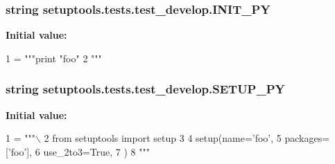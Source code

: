 \subsubsection[{I\+N\+I\+T\+\_\+\+P\+Y}]{\setlength{\rightskip}{0pt plus 5cm}string setuptools.\+tests.\+test\+\_\+develop.\+I\+N\+I\+T\+\_\+\+P\+Y}\label{namespacesetuptools_1_1tests_1_1test__develop_a4153560893d05ec7d023f67a85b90ece}
{\bfseries Initial value\+:}
\begin{DoxyCode}
1 = \textcolor{stringliteral}{"""print "foo"}
2 \textcolor{stringliteral}{"""}
\end{DoxyCode}
\hypertarget{namespacesetuptools_1_1tests_1_1test__develop_ad276e6de9b4dcd1bc0ff9daabbb0a2f5}{}
\subsubsection[{S\+E\+T\+U\+P\+\_\+\+P\+Y}]{\setlength{\rightskip}{0pt plus 5cm}string setuptools.\+tests.\+test\+\_\+develop.\+S\+E\+T\+U\+P\+\_\+\+P\+Y}\label{namespacesetuptools_1_1tests_1_1test__develop_ad276e6de9b4dcd1bc0ff9daabbb0a2f5}
{\bfseries Initial value\+:}
\begin{DoxyCode}
1 = \textcolor{stringliteral}{"""\(\backslash\)}
2 \textcolor{stringliteral}{from setuptools import setup}
3 \textcolor{stringliteral}{}
4 \textcolor{stringliteral}{setup(name='foo',}
5 \textcolor{stringliteral}{    packages=['foo'],}
6 \textcolor{stringliteral}{    use\_2to3=True,}
7 \textcolor{stringliteral}{)}
8 \textcolor{stringliteral}{"""}
\end{DoxyCode}
